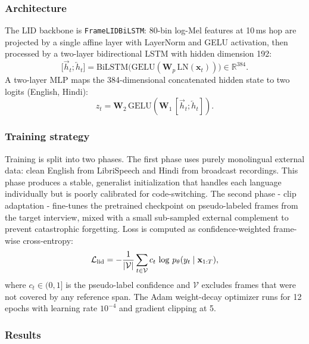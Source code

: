 \documentclass[10pt,twocolumn,letterpaper]{article}
\begin{document}
\subsubsection{Architecture}
The LID backbone is \texttt{FrameLIDBiLSTM}: 80-bin log-Mel features
at 10\,ms hop are projected by a single affine layer with LayerNorm
and GELU activation, then processed by a two-layer bidirectional LSTM
with hidden dimension 192:
\begin{equation}
  \bigl[\overrightarrow{h}_t;\overleftarrow{h}_t\bigr]
  =\text{BiLSTM}\!\bigl(
    \text{GELU}(\mathbf{W}_p\,\text{LN}(\mathbf{x}_t))
  \bigr)\in\mathbb{R}^{384}.
  \label{eq:bilstm}
\end{equation}
A two-layer MLP maps the 384-dimensional concatenated hidden state to
two logits (English, Hindi):
\begin{equation}
  z_t=\mathbf{W}_2\,\text{GELU}(\mathbf{W}_1\,[\overrightarrow{h}_t;\overleftarrow{h}_t]).
  \label{eq:mlphead}
\end{equation}

\subsubsection{Training strategy}
Training is split into two phases.  The first phase uses purely
monolingual external data: clean English from LibriSpeech and Hindi
from broadcast recordings.  This phase produces a stable, generalist
initialization that handles each language individually but is poorly
calibrated for code-switching.  The second phase - clip adaptation
- fine-tunes the pretrained checkpoint on pseudo-labeled frames from
the target interview, mixed with a small sub-sampled external
complement to prevent catastrophic forgetting.  Loss is computed as
confidence-weighted frame-wise cross-entropy:
\begin{equation}
  \mathcal{L}_{\rm lid}
  = -\frac{1}{|\mathcal{V}|}
  \sum_{t\in\mathcal{V}}
  c_t\,\log\,p_\theta(y_t\mid\mathbf{x}_{1:T}),
  \label{eq:lidloss}
\end{equation}
where $c_t\in(0,1]$ is the pseudo-label confidence and $\mathcal{V}$
excludes frames that were not covered by any reference span.  The Adam
weight-decay optimizer runs for 12 epochs with learning rate $10^{-4}$
and gradient clipping at 5.

\subsubsection{Results}
\end{document}
